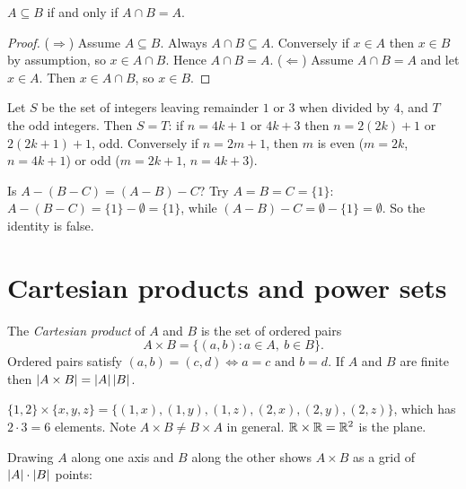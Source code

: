 \begin{proposition}
$A \subseteq B$ if and only if $A \cap B = A$.
\end{proposition}
\begin{proof}
($\Rightarrow$) Assume $A \subseteq B$. Always $A \cap B \subseteq A$. Conversely if $x \in A$
then $x \in B$ by assumption, so $x \in A \cap B$. Hence $A \cap B = A$.
($\Leftarrow$) Assume $A \cap B = A$ and let $x \in A$. Then $x \in A \cap B$, so $x \in B$.
\end{proof}

\begin{example}
Let $S$ be the set of integers leaving remainder $1$ or $3$ when divided by $4$, and $T$ the
odd integers. Then $S = T$: if $n = 4k+1$ or $4k+3$ then $n = 2(2k) + 1$ or
$2(2k+1) + 1$, odd. Conversely if $n = 2m + 1$, then $m$ is even ($m = 2k$, $n = 4k+1$) or odd
($m = 2k+1$, $n = 4k+3$).
\end{example}

\begin{example}
Is $A - (B - C) = (A - B) - C$? Try $A = B = C = \{1\}$: $A - (B-C) = \{1\} - \emptyset
= \{1\}$, while $(A - B) - C = \emptyset - \{1\} = \emptyset$. So the identity is false.
\end{example}

\section{Cartesian products and power sets}

\begin{definition}
The \emph{Cartesian product} of $A$ and $B$ is the set of ordered pairs
\[ A \times B = \{(a,b) : a \in A,\ b \in B\}. \]
Ordered pairs satisfy $(a,b) = (c,d) \iff a = c \text{ and } b = d$. If $A$ and $B$ are finite
then $\left\lvert A\times B \right\rvert = \left\lvert A \right\rvert\left\lvert B \right\rvert$.
\end{definition}

\begin{example}
$\{1,2\} \times \{x,y,z\} = \{(1,x),(1,y),(1,z),(2,x),(2,y),(2,z)\}$, which has $2\cdot 3 = 6$
elements. Note $A \times B \ne B\times A$ in general. $\mathbb{R} \times \mathbb{R} = \mathbb{R}^2$ is the plane.
\end{example}

Drawing $A$ along one axis and $B$ along the other shows $A \times B$ as a grid of
$\left\lvert A \right\rvert \cdot \left\lvert B \right\rvert$ points:
\begin{center}
\end{center}

